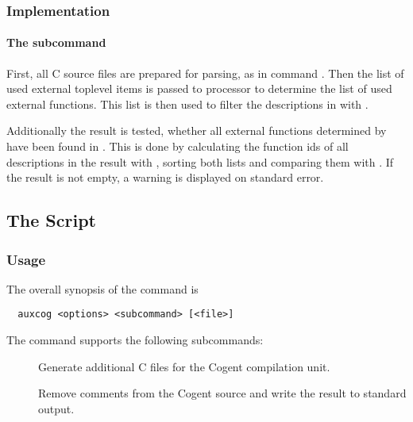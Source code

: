 \subsubsection{Implementation}

\paragraph{The subcommand } 
First, all C source files are prepared for parsing, as in command . Then the list of used external toplevel 
items  is passed to processor  to determine the list of 
used external functions. This list is then used to filter the descriptions in  with .

Additionally the result is tested, whether all external functions determined by  have been found in 
. This is done by calculating the function ids of all descriptions in the result with , 
sorting both lists and comparing them with . If the result is not empty, a warning is displayed on standard error.

\subsection{The  Script}
\label{impl-all-auxcog}

\subsubsection{Usage}

The overall synopsis of the  command is
\begin{verbatim}
  auxcog <options> <subcommand> [<file>]
\end{verbatim}

The  command supports the following subcommands:
\begin{description}
\item[] Generate additional C files for the Cogent compilation unit.

\item[] Remove comments from the Cogent source  and write the result to standard output.

\end{description}


